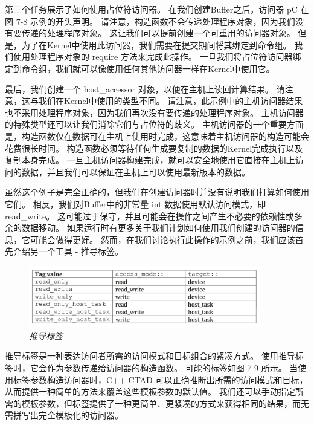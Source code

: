 第三个任务展示了如何使用占位符访问器。 在我们创建Buffer之后，访问器 pC 在图 7-8 示例的开头声明。 
请注意，构造函数不会传递处理程序对象，因为我们没有要传递的处理程序对象。 
这让我们可以提前创建一个可重用的访问器对象。 但是，为了在Kernel中使用此访问器，我们需要在提交期间将其绑定到命令组。 
我们使用处理程序对象的 require 方法来完成此操作。 
一旦我们将占位符访问器绑定到命令组，我们就可以像使用任何其他访问器一样在Kernel中使用它。

最后，我们创建一个 host\_accessor 对象，以便在主机上读回计算结果。 
请注意，这与我们在Kernel中使用的类型不同。 
请注意，此示例中的主机访问器结果也不采用处理程序对象，因为我们再次没有要传递的处理程序对象。 
主机访问器的特殊类型还可以让我们消除它们与占位符的歧义。 
主机访问器的一个重要方面是，构造函数仅在数据可在主机上使用时完成，这意味着主机访问器的构造可能会花费很长时间。 
构造函数必须等待任何生成要复制的数据的Kernel完成执行以及复制本身完成。 
一旦主机访问器构建完成，就可以安全地使用它直接在主机上访问的数据，并且我们可以保证在主机上可以使用最新版本的数据。

虽然这个例子是完全正确的，但我们在创建访问器时并没有说明我们打算如何使用它们。 
相反，我们对Buffer中的非常量 int 数据使用默认访问模式，即 read\_write。 
这可能过于保守，并且可能会在操作之间产生不必要的依赖性或多余的数据移动。 
如果运行时有更多关于我们计划如何使用我们创建的访问器的信息，它可能会做得更好。 
然而，在我们讨论执行此操作的示例之前，我们应该首先介绍另一个工具 - 推导标签。

\begin{figure}[H]
	\centering
	\includegraphics[width=0.9\textwidth]{figs/F7.9.png}
	\caption{\textit{推导标签 }}
\end{figure}

推导标签是一种表达访问者所需的访问模式和目标组合的紧凑方式。 
使用推导标签时，它会作为参数传递给访问器的构造函数。 
可能的标签如图 7-9 所示。 当使用标签参数构造访问器时，C++ CTAD 可以正确推断出所需的访问模式和目标，
从而提供一种简单的方法来覆盖这些模板参数的默认值。 
我们还可以手动指定所需的模板参数，但标签提供了一种更简单、更紧凑的方式来获得相同的结果，而无需拼写出完全模板化的访问器。


